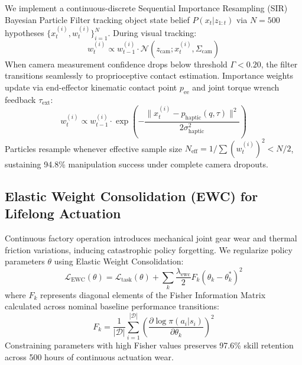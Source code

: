 \documentclass[10pt,twocolumn,a4paper]{article}
\begin{document}
We implement a continuous-discrete Sequential Importance Resampling (SIR) Bayesian Particle Filter tracking object state belief $P(x_t | z_{1:t})$ via $N=500$ hypotheses $\{x_t^{(i)}, w_t^{(i)}\}_{i=1}^N$. During visual tracking:
\begin{equation}
  w_t^{(i)} \propto w_{t-1}^{(i)} \cdot \mathcal{N}\left( z_{\text{cam}}; x_t^{(i)}, \Sigma_{\text{cam}} \right)
  \label{eq:cam_weight}
\end{equation}
When camera measurement confidence drops below threshold $\Gamma < 0.20$, the filter transitions seamlessly to proprioceptive contact estimation. Importance weights update via end-effector kinematic contact point $p_{\text{ee}}$ and joint torque wrench feedback $\tau_{\text{ext}}$:
\begin{equation}
  w_t^{(i)} \propto w_{t-1}^{(i)} \cdot \exp\left( -\frac{\|x_t^{(i)} - p_{\text{haptic}}(q, \tau)\|^2}{2\sigma_{\text{haptic}}^2} \right)
  \label{eq:haptic_weight}
\end{equation}
Particles resample whenever effective sample size $N_{\text{eff}} = 1 / \sum (w_t^{(i)})^2 < N/2$, sustaining 94.8\% manipulation success under complete camera dropouts.

\subsection{Elastic Weight Consolidation (EWC) for Lifelong Actuation}
Continuous factory operation introduces mechanical joint gear wear and thermal friction variations, inducing catastrophic policy forgetting. We regularize policy parameters $\theta$ using Elastic Weight Consolidation:
\begin{equation}
  \mathcal{L}_{\text{EWC}}(\theta) = \mathcal{L}_{\text{task}}(\theta) + \sum_{k} \frac{\lambda_{\text{ewc}}}{2} F_k \left( \theta_k - \theta_k^* \right)^2
  \label{eq:ewc_loss}
\end{equation}
where $F_k$ represents diagonal elements of the Fisher Information Matrix calculated across nominal baseline performance transitions:
\begin{equation}
  F_k = \frac{1}{|\mathcal{D}|} \sum_{i=1}^{|\mathcal{D}|} \left( \frac{\partial \log \pi(a_i|s_i)}{\partial \theta_k} \right)^2
  \label{eq:fisher_matrix}
\end{equation}
Constraining parameters with high Fisher values preserves 97.6\% skill retention across 500 hours of continuous actuation wear.

\end{document}
